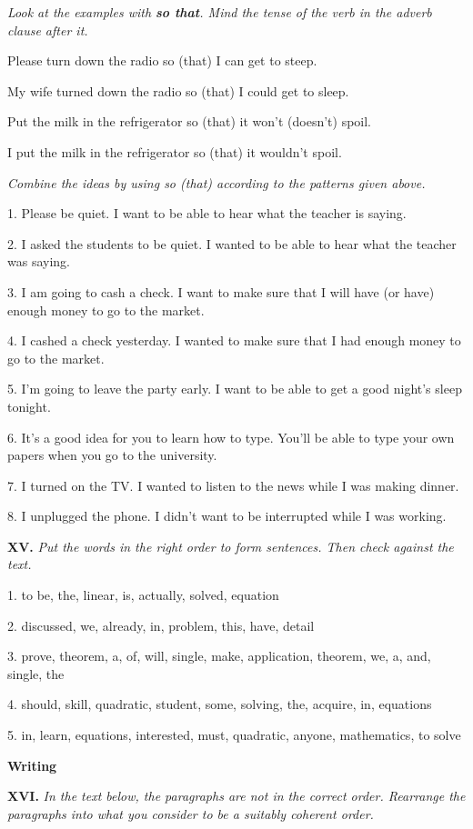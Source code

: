 \documentclass[a4paper]{article}
\newcommand{\ESect}[1]{\medskip\par{\large \textbf{#1}}\par}
\newcommand{\ETask}[2]{\medskip\par\textbf{#1.} \textit{#2}\par}
\begin{document}
\textit{Look at the examples with \textbf{so that}. Mind the tense of the verb in the adverb clause after it.}

Please turn down the radio so (that) I can get to steep.

My wife turned down the radio so (that) I could get to sleep.

Put the milk in the refrigerator so (that) it won't (doesn't) spoil.

I put the milk in the refrigerator so (that) it wouldn't spoil.

\textit{Combine the ideas by using so (that) according to the patterns given above.}

1. Please be quiet. I want to be able to hear what the teacher is saying.

2. I asked the students to be quiet. I wanted to be able to hear what the teacher was saying.

3. I am going to cash a check. I want to make sure that I will have (or have) enough money to go to the market.

4. I cashed a check yesterday. I wanted to make sure that I had enough money to go to the market.

5. I'm going to leave the party early. I want to be able to get a good night's sleep tonight.

6. It's a good idea for you to learn how to type. You'll be able to type your own papers when you go to the university.

7. I turned on the TV. I wanted to listen to the news while I was making dinner.

8. I unplugged the phone. I didn't want to be interrupted while I was working.

\ETask{XV}{Put the words in the right order to form sentences. Then check against the text.}

1. to be, the, linear, is, actually, solved, equation

2. discussed, we, already, in, problem, this, have, detail

3. prove, theorem, a, of, will, single, make, application, theorem, we, a, and, single, the

4. should, skill, quadratic, student, some, solving, the, acquire, in, equations

5. in, learn, equations, interested, must, quadratic, anyone, mathematics, to solve

\ESect{Writing}

\ETask{XVI}{In the text below, the paragraphs are not in the correct order. Rearrange the paragraphs into what you consider to
be a suitably coherent order.}
\end{document}
